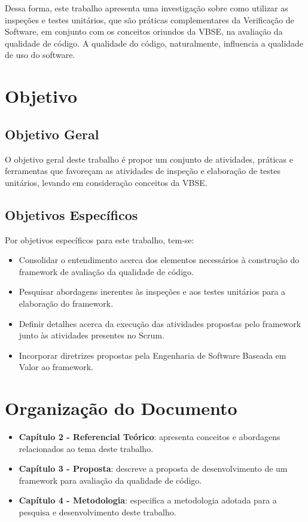 Dessa forma, este trabalho apresenta uma investigação sobre como utilizar as inspeções e testes unitários, que são práticas complementares da Verificação de Software, em conjunto com os conceitos oriundos da VBSE, na avaliação da qualidade de código. A qualidade do código, naturalmente, influencia a qualidade de uso do software.

\section{Objetivo}

\subsection{Objetivo Geral}

O objetivo geral deste trabalho é propor um conjunto de atividades, práticas e ferramentas que favoreçam as atividades de inspeção e elaboração de testes unitários, levando em consideração conceitos da VBSE.

\subsection{Objetivos Específicos}

Por objetivos específicos para este trabalho, tem-se:

\begin{itemize}
	\item Consolidar o entendimento acerca dos elementos necessários à construção do framework de avaliação da qualidade de código.
	\item Pesquisar abordagens inerentes às inspeções e aos testes unitários para a elaboração do framework.
	\item Definir detalhes acerca da execução das atividades propostas pelo framework junto às atividades presentes no Scrum.
	\item Incorporar diretrizes propostas pela Engenharia de Software Baseada em Valor ao framework.
\end{itemize}

\section{Organização do Documento}

\begin{itemize}
	\item \textbf{Capítulo 2 - Referencial Teórico}: apresenta conceitos e abordagens relacionados ao tema deste trabalho.

	\item \textbf{Capítulo 3 - Proposta}: descreve a proposta de desenvolvimento de um framework para avaliação da qualidade de código.

	\item \textbf{Capítulo 4 - Metodologia}: especifica a metodologia adotada para a pesquisa e desenvolvimento deste trabalho.
\end{itemize}